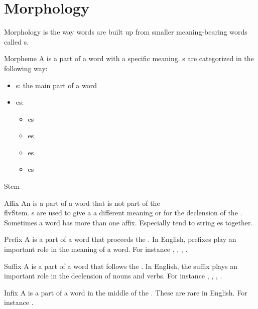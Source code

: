 \section{Morphology}
\begin{df}{Morphology}
\sb{} is the way words are built up from smaller meaning-bearing words called s.
\end{df}
\begin{df}{Morpheme}
A \sb{} is a part of a word with a specific meaning. \sb{}s are categorized in the following way:
\begin{itemize}
 \item {}s: the main part of a word
 \item {}es:
 \begin{itemize}
  \item {}es
  \item {}es
  \item {}es
  \item {}es
 \end{itemize}
\end{itemize}
\end{df}
\begin{df}{Stem}
\end{df}
\begin{df}{Affix}
An \sb{} is a part of a word that is not part of the \\flv{Stem}. \sb{}s are used to give a  a different meaning or for the declension of the . Sometimes a word has more than one affix. Especially  tend to string \sb{}es together.
\end{df}
\begin{df}{Prefix}
A \sb{} is a part of a word that proceeds the . In English, prefixes play an important role in the meaning of a word. For instance , , , .
\end{df}
\begin{df}{Suffix}
A \sb{} is a part of a word that follows the . In English, the suffix plays an important role in the declension of nouns and verbs. For instance , , , .
\end{df}
\begin{df}{Infix}
A \sb{} is a part of a word in the middle of the . These are rare in English. For instance .
\end{df}

